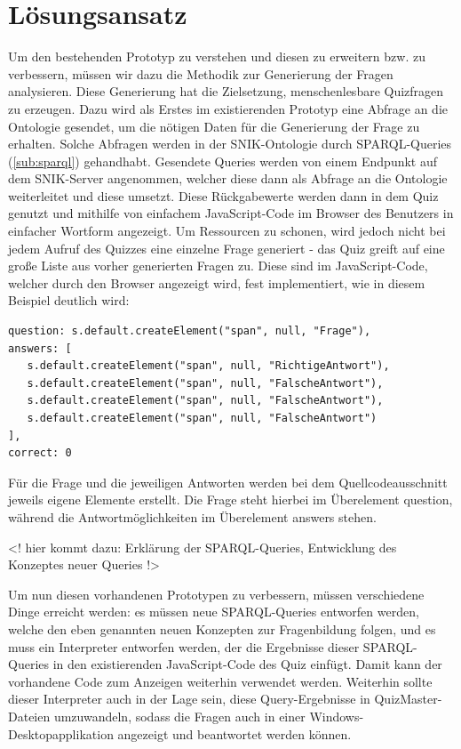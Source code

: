 \documentclass[headsepline,titlepage,ngerman,twoside,12pt]{report}
\newcommand\todo[1]{}%
\begin{document}
\chapter{Lösungsansatz}
\label{ch:Lösungsansatz}
\todo{Der Lösungsansatz ist eine kurze Beschreibung der Arbeitshypothese sowie des Vorgehens zur Lösung der in der Einleitung beschriebenen Probleme.}

Um den bestehenden Prototyp zu verstehen und diesen zu erweitern bzw. zu verbessern, müssen wir dazu die Methodik zur Generierung der Fragen analysieren.
Diese Generierung hat die Zielsetzung, menschenlesbare Quizfragen zu erzeugen.
Dazu wird als Erstes im existierenden Prototyp eine Abfrage an die Ontologie gesendet, um die nötigen Daten für die Generierung der Frage zu erhalten.
Solche Abfragen werden in der SNIK-Ontologie durch SPARQL-Queries (\cref{sub:sparql}) gehandhabt. Gesendete Queries werden von einem Endpunkt auf dem SNIK-Server angenommen, welcher diese dann als Abfrage an die Ontologie weiterleitet und diese umsetzt. Diese Rückgabewerte werden dann in dem Quiz genutzt und mithilfe von einfachem JavaScript-Code im Browser des Benutzers in einfacher Wortform angezeigt. Um Ressourcen zu schonen, wird jedoch nicht bei jedem Aufruf des Quizzes eine einzelne Frage generiert - das Quiz greift auf eine große Liste aus vorher generierten Fragen zu.
Diese sind im JavaScript-Code, welcher durch den Browser angezeigt wird, fest implementiert, wie in diesem Beispiel deutlich wird:
\begin{lstlisting}
question: s.default.createElement("span", null, "Frage"),
answers: [
   s.default.createElement("span", null, "RichtigeAntwort"),
   s.default.createElement("span", null, "FalscheAntwort"),
   s.default.createElement("span", null, "FalscheAntwort"),
   s.default.createElement("span", null, "FalscheAntwort")
],
correct: 0
\end{lstlisting}
Für die Frage und die jeweiligen Antworten werden bei dem Quellcodeausschnitt jeweils eigene Elemente erstellt. Die Frage steht hierbei im Überelement question, während die Antwortmöglichkeiten im Überelement answers stehen.

<! hier kommt dazu: Erklärung der SPARQL-Queries, Entwicklung des Konzeptes neuer Queries !>

Um nun diesen vorhandenen Prototypen zu verbessern, müssen verschiedene Dinge erreicht werden: es müssen neue SPARQL-Queries entworfen werden, welche den eben genannten neuen Konzepten zur Fragenbildung folgen, und es muss ein Interpreter entworfen werden, der die Ergebnisse dieser SPARQL-Queries in den existierenden JavaScript-Code des Quiz einfügt. Damit kann der vorhandene Code zum Anzeigen weiterhin verwendet werden. Weiterhin sollte dieser Interpreter auch in der Lage sein, diese Query-Ergebnisse in QuizMaster-Dateien umzuwandeln, sodass die Fragen auch in einer Windows-Desktopapplikation angezeigt und beantwortet werden können.
\end{document}
